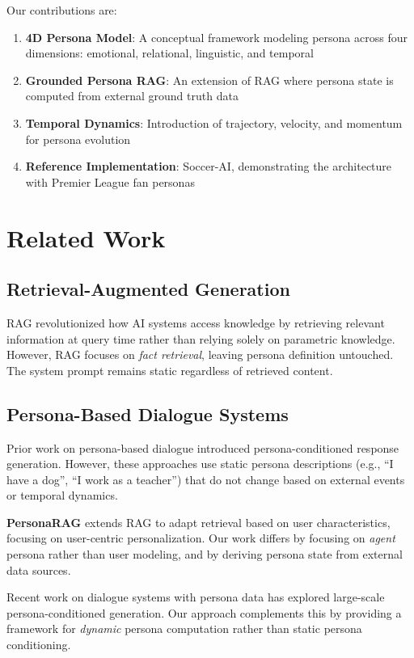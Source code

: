 \documentclass[11pt]{article}
\begin{document}
Our contributions are:
\begin{enumerate}
    \item \textbf{4D Persona Model}: A conceptual framework modeling persona across four dimensions: emotional, relational, linguistic, and temporal
    \item \textbf{Grounded Persona RAG}: An extension of RAG where persona state is computed from external ground truth data
    \item \textbf{Temporal Dynamics}: Introduction of trajectory, velocity, and momentum for persona evolution
    \item \textbf{Reference Implementation}: Soccer-AI, demonstrating the architecture with Premier League fan personas
\end{enumerate}

\section{Related Work}

\subsection{Retrieval-Augmented Generation}
RAG \cite{lewis2020retrieval} revolutionized how AI systems access knowledge by retrieving relevant information at query time rather than relying solely on parametric knowledge. However, RAG focuses on \textit{fact retrieval}, leaving persona definition untouched. The system prompt remains static regardless of retrieved content.

\subsection{Persona-Based Dialogue Systems}
Prior work on persona-based dialogue \cite{zhang2018personalizing} introduced persona-conditioned response generation. However, these approaches use static persona descriptions (e.g., ``I have a dog'', ``I work as a teacher'') that do not change based on external events or temporal dynamics.

\textbf{PersonaRAG} \cite{personarag2024} extends RAG to adapt retrieval based on user characteristics, focusing on user-centric personalization. Our work differs by focusing on \textit{agent} persona rather than user modeling, and by deriving persona state from external data sources.

Recent work on dialogue systems with persona data \cite{personadialogue2024} has explored large-scale persona-conditioned generation. Our approach complements this by providing a framework for \textit{dynamic} persona computation rather than static persona conditioning.
\end{document}

